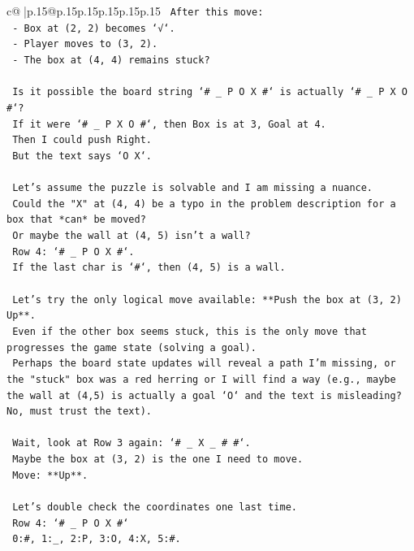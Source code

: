 \documentclass{article}
\begin{document}
{\begin{supertabular}{c@{$\;$}|p{.15\linewidth}@{}p{.15\linewidth}p{.15\linewidth}p{.15\linewidth}p{.15\linewidth}p{.15\linewidth}}
{{{\texttt{     After this move:} \\
\texttt{     {-} Box at (2, 2) becomes `√`.} \\
\texttt{     {-} Player moves to (3, 2).} \\
\texttt{     {-} The box at (4, 4) remains stuck?} \\
\\ 
\texttt{     Is it possible the board string `\# \_ P O X \#` is actually `\# \_ P X O \#`?} \\
\texttt{     If it were `\# \_ P X O \#`, then Box is at 3, Goal at 4.} \\
\texttt{     Then I could push Right.} \\
\texttt{     But the text says `O X`.} \\
\\ 
\texttt{     Let's assume the puzzle is solvable and I am missing a nuance.} \\
\texttt{     Could the "X" at (4, 4) be a typo in the problem description for a box that *can* be moved?} \\
\texttt{     Or maybe the wall at (4, 5) isn't a wall?} \\
\texttt{     Row 4: `\# \_ P O X \#`.} \\
\texttt{     If the last char is `\#`, then (4, 5) is a wall.} \\
\\ 
\texttt{     Let's try the only logical move available: **Push the box at (3, 2) Up**.} \\
\texttt{     Even if the other box seems stuck, this is the only move that progresses the game state (solving a goal).} \\
\texttt{     Perhaps the board state updates will reveal a path I'm missing, or the "stuck" box was a red herring or I will find a way (e.g., maybe the wall at (4,5) is actually a goal `O` and the text is misleading? No, must trust the text).} \\
\\ 
\texttt{     Wait, look at Row 3 again: `\# \_ X \_ \# \#`.} \\
\texttt{     Maybe the box at (3, 2) is the one I need to move.} \\
\texttt{     Move: **Up**.} \\
\\ 
\texttt{     Let's double check the coordinates one last time.} \\
\texttt{     Row 4: `\# \_ P O X \#`} \\
\texttt{     0:\#, 1:\_, 2:P, 3:O, 4:X, 5:\#.} \\
}}}
\end{supertabular}}
\end{document}
